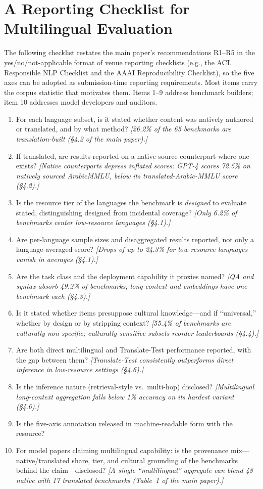 \documentclass[letterpaper]{article}
\begin{document}
\section{A Reporting Checklist for Multilingual Evaluation}
\label{sec:checklist}
The following checklist restates the main paper's recommendations R1--R5 in the yes/no/not-applicable format of venue reporting checklists (e.g., the ACL Responsible NLP Checklist and the AAAI Reproducibility Checklist), so the five axes can be adopted as submission-time reporting requirements. Most items carry the corpus statistic that motivates them. Items 1--9 address benchmark builders; item 10 addresses model developers and auditors.
\begin{enumerate}\itemsep2pt\parskip0pt
\item For each language subset, is it stated whether content was natively authored or translated, and by what method? \emph{[26.2\% of the 65 benchmarks are translation-built (\S4.2 of the main paper).]}
\item If translated, are results reported on a native-source counterpart where one exists? \emph{[Native counterparts depress inflated scores: GPT-4 scores 72.5\% on natively sourced ArabicMMLU, below its translated-Arabic-MMLU score (\S4.2).]}
\item Is the resource tier of the languages the benchmark is \emph{designed} to evaluate stated, distinguishing designed from incidental coverage? \emph{[Only 6.2\% of benchmarks center low-resource languages (\S4.1).]}
\item Are per-language sample sizes and disaggregated results reported, not only a language-averaged score? \emph{[Drops of up to 24.3\% for low-resource languages vanish in averages (\S4.1).]}
\item Are the task class and the deployment capability it proxies named? \emph{[QA and syntax absorb 49.2\% of benchmarks; long-context and embeddings have one benchmark each (\S4.3).]}
\item Is it stated whether items presuppose cultural knowledge---and if ``universal,'' whether by design or by stripping context? \emph{[55.4\% of benchmarks are culturally non-specific; culturally sensitive subsets reorder leaderboards (\S4.4).]}
\item Are both direct multilingual and Translate-Test performance reported, with the gap between them? \emph{[Translate-Test consistently outperforms direct inference in low-resource settings (\S4.6).]}
\item Is the inference nature (retrieval-style vs.\ multi-hop) disclosed? \emph{[Multilingual long-context aggregation falls below 1\% accuracy on its hardest variant (\S4.6).]}
\item Is the five-axis annotation released in machine-readable form with the resource?
\item For model papers claiming multilingual capability: is the provenance mix---native/translated share, tier, and cultural grounding of the benchmarks behind the claim---disclosed? \emph{[A single ``multilingual'' aggregate can blend 48 native with 17 translated benchmarks (Table~1 of the main paper).]}
\end{enumerate}


\end{document}
